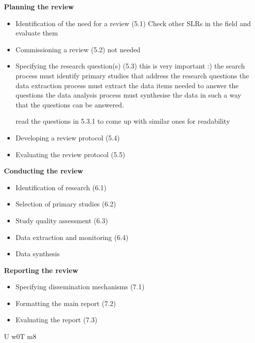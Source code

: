 \documentclass[10pt,twocolumn]{article}
\begin{document}
\textbf{Planning the review}
\begin{itemize}
\item Identification of the need for a review (5.1)
Check other SLRs in the field and evaluate them
\item Commissioning a review (5.2)
not needed
\item Specifying the research question(s) (5.3)
this is very important :)
the search process must identify primary studies that address the research questions
the data extraction process must extract the data items needed to answer the questions
the data analysis process must synthesise the data in such a way that the questions can be answered.

read the questions in 5.3.1 to come up with similar ones for readability

\item Developing a review protocol (5.4)

\item Evaluating the review protocol (5.5)
\end{itemize}

\textbf{Conducting the review}
\begin{itemize}
\item Identification of research (6.1)
\item Selection of primary studies (6.2)
\item Study quality assessment (6.3)
\item Data extraction and monitoring (6.4)
\item Data synthesis
\end{itemize}

\textbf{Reporting the review}
\begin{itemize}
\item Specifying dissemination mechanisms (7.1)
\item Formatting the main report (7.2)
\item Evaluating the report (7.3)
\end{itemize} 





U w0T m8
\end{document}

